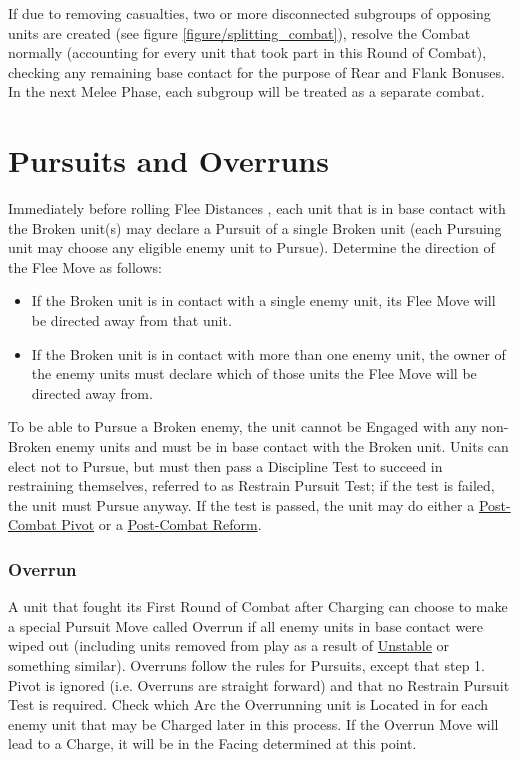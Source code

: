 If due to removing casualties, two or more disconnected subgroups of opposing units are created (see figure \ref{figure/splitting_combat}), resolve the Combat normally (accounting for every unit that took part in this Round of Combat), checking any remaining base contact for the purpose of Rear and Flank Bonuses. In the next Melee Phase, each subgroup will be treated as a separate combat.

\columnbreak

\section{Pursuits and Overruns}
\label{pursuits_and_overruns}

Immediately before rolling Flee Distances , each unit that is in base contact with the Broken unit(s) may declare a Pursuit of a single Broken unit (each Pursuing unit may choose any eligible enemy unit to Pursue). Determine the direction of the Flee Move as follows:
\begin{itemize}
	\item If the Broken unit is in contact with a single enemy unit, its Flee Move will be directed away from that unit.
	\item If the Broken unit is in contact with more than one enemy unit, the owner of the enemy units must declare which of those units the Flee Move will be directed away from.
\end{itemize}

To be able to Pursue a Broken enemy, the unit cannot be Engaged with any non-Broken enemy units and must be in base contact with the Broken unit. Units can elect not to Pursue, but must then pass a Discipline Test to succeed in restraining themselves, referred to as Restrain Pursuit Test; if the test is failed, the unit must Pursue anyway. If the test is passed, the unit may do either a \hyperref[post_combat_pivot]{Post-Combat Pivot} or a \hyperref[post_combat_reform]{Post-Combat Reform}.

\subsubsection{Overrun}
\label{overrun}

A unit that fought its First Round of Combat after Charging can choose to make a special Pursuit Move called Overrun if all enemy units in base contact were wiped out (including units removed from play as a result of \hyperref[unstable]{Unstable} or something similar). Overruns follow the rules for Pursuits, except that step 1. Pivot is ignored (i.e. Overruns are straight forward) and that no Restrain Pursuit Test is required. Check which Arc the Overrunning unit is Located in for each enemy unit that may be Charged later in this process. If the Overrun Move will lead to a Charge, it will be in the Facing determined at this point.

